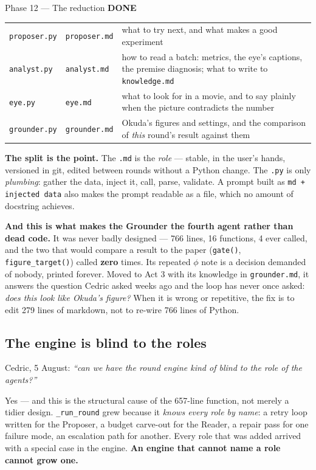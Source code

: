 \documentclass[11pt,a4paper]{article}
\newcommand{\code}[1]{\texttt{#1}}
\newcommand{\done}{\textcolor{good}{\textbf{DONE}}}
\begin{document}
\begin{phasebox}{Phase 12 --- The reduction \hfill \done}
\begin{center}\small
\begin{tabular}{llp{5.6cm}}
\toprule
\code{proposer.py} & \code{proposer.md} & what to try next, and what makes a good experiment \\
\code{analyst.py}  & \code{analyst.md}  & how to read a batch: metrics, the eye's captions, the
                                          premise diagnosis; what to write to \code{knowledge.md} \\
\code{eye.py}      & \code{eye.md}      & what to look for in a movie, and to say plainly when the
                                          picture contradicts the number \\
\code{grounder.py} & \code{grounder.md} & Okuda's figures and settings, and the comparison of
                                          \emph{this} round's result against them \\
\bottomrule
\end{tabular}
\end{center}

\noindent \textbf{The split is the point.} The \code{.md} is the \emph{role} --- stable, in the
user's hands, versioned in git, edited between rounds without a Python change. The \code{.py} is only
\emph{plumbing}: gather the data, inject it, call, parse, validate. A prompt built as
\code{md + injected data} also makes the prompt readable as a file, which no amount of docstring
achieves.

\textbf{And this is what makes the Grounder the fourth agent rather than dead code.} It was never
badly designed --- 766 lines, 16 functions, 4 ever called, and the two that would compare a result to
the paper (\code{gate()}, \code{figure\_target()}) called \textbf{zero} times. Its repeated $\phi$
note is a decision demanded of nobody, printed forever. Moved to Act 3 with its knowledge in
\code{grounder.md}, it answers the question Cedric asked weeks ago and the loop has never once
asked: \emph{does this look like Okuda's figure?} When it is wrong or repetitive, the fix is to edit
279 lines of markdown, not to re-wire 766 lines of Python.

\subsection*{The engine is blind to the roles}
Cedric, 5 August: \emph{``can we have the round engine kind of blind to the role of the agents?''}

Yes --- and this is the structural cause of the 657-line function, not merely a tidier design.
\code{\_run\_round} grew because it \emph{knows every role by name}: a retry loop written for the
Proposer, a budget carve-out for the Reader, a repair pass for one failure mode, an escalation path
for another. Every role that was added arrived with a special case in the engine. \textbf{An engine
that cannot name a role cannot grow one.}


\end{phasebox}
\end{document}

